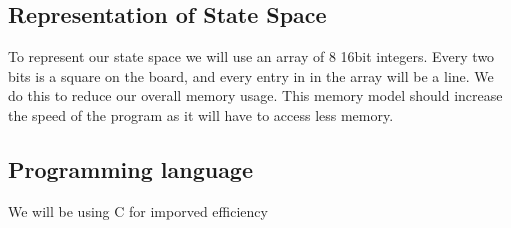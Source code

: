 \documentclass[12pt]{article}
\begin{document}
\subsection*{Representation of State Space}
To represent our state space we will use an array of 8 16bit integers.
Every two bits is a square on the board, and every entry in in the array will be a line.
We do this to reduce our overall memory usage.
This memory model should increase the speed of the program as it will have to access less memory.

\subsection*{Programming language}
We will be using C for imporved efficiency
\end{document}

